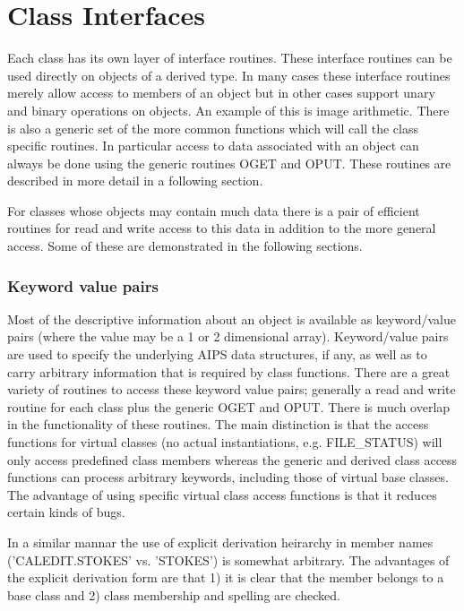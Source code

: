 \section{Class Interfaces}

   Each class has its own layer of interface routines.  These
interface routines can be used directly on objects of a derived type.
In many cases these interface routines merely allow access to members
of an object but in other cases support unary and binary operations on
objects.  An example of this is image arithmetic.
There is also a generic set of the more common functions which will
call the class specific routines.  In particular access to data
associated with an object can always be done using the generic
routines OGET and OPUT.  These routines are described in more detail
in a following section.

   For classes whose objects may contain much data there is a pair of
efficient routines for read and write access to this data in addition
to the more general access.  Some of these are demonstrated in the
following sections.

\subsubsection {Keyword value pairs}

   Most of the descriptive information about an object is available as
keyword/value pairs (where the value may be a 1 or 2 dimensional
array).  Keyword/value pairs are used to specify the underlying AIPS
data structures, if any, as well as to carry arbitrary information
that is required by class functions.  There are a great variety of
routines to access these keyword value pairs; generally a read and
write routine for each class plus the generic OGET and OPUT.  There
is much overlap in the functionality of these routines.  The main
distinction is that the access functions for virtual classes (no
actual instantiations, e.g. FILE\_STATUS) will only access predefined
class members whereas the generic and derived class access functions
can process arbitrary keywords, including those of virtual base
classes.  The advantage of using specific virtual class access
functions is that it reduces certain kinds of bugs.

   In a similar mannar the use of explicit derivation heirarchy in
member names ('CALEDIT.STOKES' vs. 'STOKES') is somewhat arbitrary.
The advantages of the explicit derivation form are that 1) it is clear
that the member belongs to a base class and 2) class membership and
spelling are checked.


